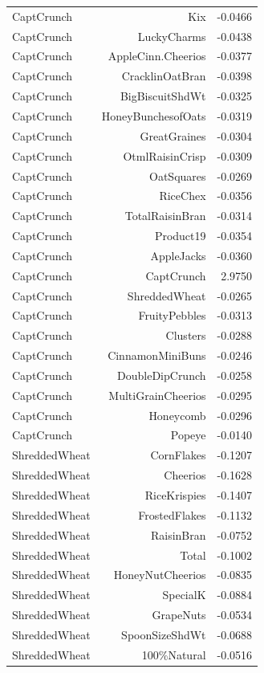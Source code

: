 \begin{longtable}{@{}lrr@{}}
CaptCrunch & Kix & -0.0466 \\
CaptCrunch & LuckyCharms & -0.0438 \\
CaptCrunch & AppleCinn.Cheerios & -0.0377 \\
CaptCrunch & CracklinOatBran & -0.0398 \\
CaptCrunch & BigBiscuitShdWt & -0.0325 \\
CaptCrunch & HoneyBunchesofOats & -0.0319 \\
CaptCrunch & GreatGraines & -0.0304 \\
CaptCrunch & OtmlRaisinCrisp & -0.0309 \\
CaptCrunch & OatSquares & -0.0269 \\
CaptCrunch & RiceChex & -0.0356 \\
CaptCrunch & TotalRaisinBran & -0.0314 \\
CaptCrunch & Product19 & -0.0354 \\
CaptCrunch & AppleJacks & -0.0360 \\
CaptCrunch & CaptCrunch & 2.9750 \\
CaptCrunch & ShreddedWheat & -0.0265 \\
CaptCrunch & FruityPebbles & -0.0313 \\
CaptCrunch & Clusters & -0.0288 \\
CaptCrunch & CinnamonMiniBuns & -0.0246 \\
CaptCrunch & DoubleDipCrunch & -0.0258 \\
CaptCrunch & MultiGrainCheerios & -0.0295 \\
CaptCrunch & Honeycomb & -0.0296 \\
CaptCrunch & Popeye & -0.0140 \\
ShreddedWheat & CornFlakes & -0.1207 \\
ShreddedWheat & Cheerios & -0.1628 \\
ShreddedWheat & RiceKrispies & -0.1407 \\
ShreddedWheat & FrostedFlakes & -0.1132 \\
ShreddedWheat & RaisinBran & -0.0752 \\
ShreddedWheat & Total & -0.1002 \\
ShreddedWheat & HoneyNutCheerios & -0.0835 \\
ShreddedWheat & SpecialK & -0.0884 \\
ShreddedWheat & GrapeNuts & -0.0534 \\
ShreddedWheat & SpoonSizeShdWt & -0.0688 \\
ShreddedWheat & 100\%Natural & -0.0516 \\

\end{longtable}
